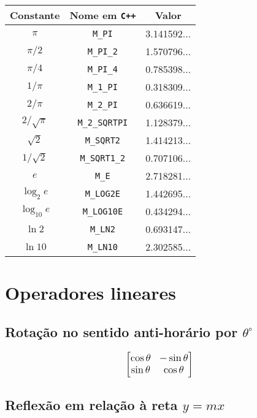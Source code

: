 \begin{center}
\begin{tabular}{|c|c|c|}
  \hline
  Constante & Nome em \texttt{C++} & Valor \\
  \hline
  $\pi$ & \texttt{M\_PI} & 3.141592... \\
  \hline
  $\pi / 2$ & \texttt{M\_PI\_2} & 1.570796... \\
  \hline
  $\pi / 4$ & \texttt{M\_PI\_4} & 0.785398... \\
  \hline
  $1 / \pi$ & \texttt{M\_1\_PI} & 0.318309... \\
  \hline
  $2 / \pi$ & \texttt{M\_2\_PI} & 0.636619... \\
  \hline
  $2 / \sqrt{\pi}$ & \texttt{M\_2\_SQRTPI} & 1.128379... \\
  \hline
  $\sqrt{2}$ & \texttt{M\_SQRT2} & 1.414213... \\
  \hline
  $1 / \sqrt{2}$ & \texttt{M\_SQRT1\_2} & 0.707106... \\
  \hline
  $e$ & \texttt{M\_E} & 2.718281... \\
  \hline
  $\log_2{e}$ & \texttt{M\_LOG2E} & 1.442695... \\
  \hline
  $\log_{10}{e}$ & \texttt{M\_LOG10E} & 0.434294... \\
  \hline
  $\ln{2}$ & \texttt{M\_LN2} & 0.693147... \\
  \hline
  $\ln{10}$ & \texttt{M\_LN10} & 2.302585... \\
  \hline
\end{tabular}
\end{center}


\section{Operadores lineares}


\subsection{Rotação no sentido anti-horário por $\theta ^\circ$}

\begin{equation*} 
\large
\begin{bmatrix}
    \cos \theta & -\sin \theta \\
    \sin \theta & \cos \theta
\end{bmatrix}
\end{equation*}


\subsection{Reflexão em relação à reta $y = mx$ }

